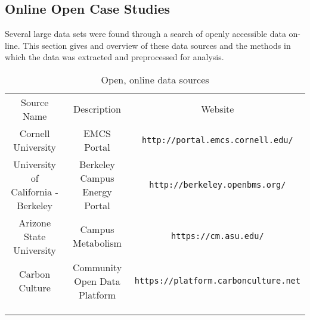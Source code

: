 \subsection{Online Open Case Studies}

Several large data sets were found through a search of openly accessible data on-line. This section gives and overview of these data sources and the methods in which the data was extracted and preprocessed for analysis.

\begin{table} 
    \begin{tabular}{ c c c }
        Source Name & Description & Website\\ 
        Cornell University & EMCS Portal & \verb|http://portal.emcs.cornell.edu/| \\ 
        University of California - Berkeley & Berkeley Campus Energy Portal &  \verb|http://berkeley.openbms.org/|\\ 
        Arizone State University & Campus Metabolism  & \verb|https://cm.asu.edu/| \\ 
        Carbon Culture & Community Open Data Platform & \verb|https://platform.carbonculture.net| \\ 
         &  &  \\ 
         &  &  \\ 
         &  &  \\ 
    \end{tabular} 
    \caption{Open, online data sources} 
\end{table}